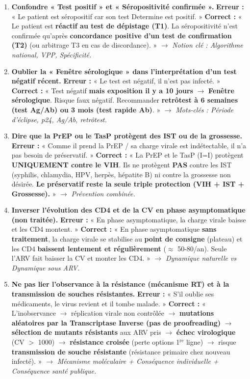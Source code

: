 \documentclass[11pt]{article}
\begin{document}
\begin{attention}
\begin{enumerate}
    \item \textbf{Confondre « Test positif » et « Séropositivité confirmée ».} \textbf{Erreur :} « Le patient est séropositif car son test Determine est positif. » \textbf{Correct :} « Le patient est \textbf{réactif au test de dépistage (T1)}. La séropositivité n'est confirmée qu'après \textbf{concordance positive d'un test de confirmation (T2)} (ou arbitrage T3 en cas de discordance). » $\rightarrow$ \textit{Notion clé : Algorithme national, VPP, Spécificité.}
    \item \textbf{Oublier la « Fenêtre sérologique » dans l'interprétation d'un test négatif récent.} \textbf{Erreur :} « Le test est négatif, il n'est pas infecté. » \textbf{Correct :} « Test négatif \textbf{mais exposition il y a 10 jours} $\rightarrow$ \textbf{Fenêtre sérologique}. Risque faux négatif. Recommander \textbf{retrôtest à 6 semaines (test Ag/Ab) ou 3 mois (test rapide Ab)}. » $\rightarrow$ \textit{Mots-clés : Période d'éclipse, p24, Ag/Ab, retrôtest.}
    \item \textbf{Dire que la PrEP ou le TasP protègent des IST ou de la grossesse.} \textbf{Erreur :} « Comme il prend la PrEP / sa charge virale est indétectable, il n'a pas besoin de préservatif. » \textbf{Correct :} « La PrEP et le TasP (I=I) protègent \textbf{UNIQUEMENT contre le VIH}. Ils ne protègent \textbf{PAS} contre les IST (syphilis, chlamydia, HPV, herpès, hépatite B) ni contre la grossesse non désirée. \textbf{Le préservatif reste la seule triple protection (VIH + IST + Grossesse).} » $\rightarrow$ \textit{Prévention combinée.}
    \item \textbf{Inverser l'évolution des CD4 et de la CV en phase asymptomatique (non traitée).} \textbf{Erreur :} « En phase asymptomatique, la charge virale baisse et les CD4 montent. » \textbf{Correct :} « En phase asymptomatique \textbf{sans traitement}, la charge virale se stabilise au \textbf{point de consigne} (plateau) et les CD4 \textbf{baissent lentement et régulièrement} ($\approx$ 50-80/an). Seule l'ARV fait baisser la CV et monter les CD4. » $\rightarrow$ \textit{Dynamique naturelle vs Dynamique sous ARV.}
    \item \textbf{Ne pas lier l'observance à la résistance (mécanisme RT) et à la transmission de souches résistantes.} \textbf{Erreur :} « S'il oublie ses médicaments, le virus revient et il tombe malade. » \textbf{Correct :} « L'inobservance $\rightarrow$ réplication virale non contrôlée $\rightarrow$ \textbf{mutations aléatoires par la Transcriptase Inverse (pas de proofreading)} $\rightarrow$ \textbf{sélection de mutants résistants} aux ARV pris $\rightarrow$ \textbf{échec virologique} (CV $>$ 1000) $\rightarrow$ \textbf{résistance croisée} (perte options 1$^{\text{re}}$ ligne) $\rightarrow$ risque \textbf{transmission de souche résistante} (résistance primaire chez nouveau infecté). » $\rightarrow$ \textit{Mécanisme moléculaire + Conséquence individuelle + Conséquence santé publique.}
\end{enumerate}
\end{attention}
\end{document}

